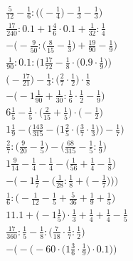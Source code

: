 \documentclass[8pt]{article}
\begin{document}
\begin{align}
\frac{5}{12} - \frac{1}{6} : \Big(\big(-\frac{1}{4}\big) - \frac{1}{3} - \frac{1}{3}\Big) \\
\frac{17}{240} : 0.1 + 1\frac{4}{6} \cdot 0.1 + \frac{1}{32} : \frac{1}{4} \\
-\Big(-\frac{9}{50} : \big(\frac{8}{15} - \frac{1}{3}\big) + \frac{19}{90} - \frac{1}{9}\Big) \\
\frac{1}{90} : 0.1 : \Big(1\frac{17}{72} - \frac{1}{8} \cdot \big(0.9 \cdot \frac{1}{9}\big)\Big) \\
\big(-\frac{17}{21}\big) - \frac{1}{3} : \big(\frac{2}{7} \cdot \frac{1}{2}\big) \cdot \frac{1}{8} \\
-\big(-1\frac{1}{90} + \frac{1}{30} : \frac{1}{6} \cdot \frac{1}{2} - \frac{1}{9}\big) \\
6\frac{1}{5} - \frac{1}{5} \cdot \big(\frac{2}{15} + \frac{1}{5}\big) \cdot \big(-\frac{1}{2}\big) \\
1\frac{1}{9} - \bigg(\frac{143}{315} - \Big(1\frac{2}{5} \cdot \big(\frac{3}{7} \cdot \frac{1}{3}\big)\Big) - \frac{1}{7}\bigg) \\
\frac{2}{7} : \big(\frac{9}{20} - \frac{1}{5}\big) - \big(\frac{68}{315} - \frac{1}{5} : \frac{1}{9}\big) \\
1\frac{9}{14} - \frac{1}{4} - \frac{1}{4} - \big(\frac{1}{56} + \frac{1}{4} - \frac{1}{8}\big) \\
-\bigg(-1\frac{1}{7} - \Big(\frac{1}{28} : \frac{1}{8} + \big(-\frac{1}{7}\big)\Big)\bigg) \\
\frac{1}{6} : \big(-\frac{1}{12} - \frac{1}{5} + \frac{5}{36} + \frac{1}{9} + \frac{1}{5}\big) \\
11.1 + \big(-1\frac{1}{5}\big) \cdot \frac{1}{3} + \frac{1}{4} + \frac{1}{4} - \frac{1}{5} \\
\frac{17}{360} : \frac{1}{5} - \frac{1}{8} : \big(\frac{7}{18} \cdot \frac{1}{7} : \frac{1}{2}\big) \\
-\bigg(-\Big(-60 \cdot \big(1\frac{3}{6} \cdot \frac{1}{9}\big) \cdot 0.1\Big)\bigg)
\end{align}
\end{document}
